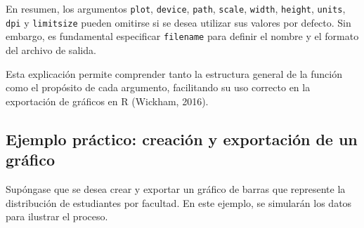 \documentclass[
  spanish,
  a4paper,
  DIV=11,
  numbers=noendperiod,
  onepage,
  openany]{scrreprt}
\begin{document}
En resumen, los argumentos \texttt{plot}, \texttt{device},
\texttt{path}, \texttt{scale}, \texttt{width}, \texttt{height},
\texttt{units}, \texttt{dpi} y \texttt{limitsize} pueden omitirse si se
desea utilizar sus valores por defecto. Sin embargo, es fundamental
especificar \texttt{filename} para definir el nombre y el formato del
archivo de salida.

Esta explicación permite comprender tanto la estructura general de la
función como el propósito de cada argumento, facilitando su uso correcto
en la exportación de gráficos en R (Wickham, 2016).

\subsection{Ejemplo práctico: creación y exportación de un
gráfico}\label{ejemplo-pruxe1ctico-creaciuxf3n-y-exportaciuxf3n-de-un-gruxe1fico}

Supóngase que se desea crear y exportar un gráfico de barras que
represente la distribución de estudiantes por facultad. En este ejemplo,
se simularán los datos para ilustrar el proceso.
\end{document}
